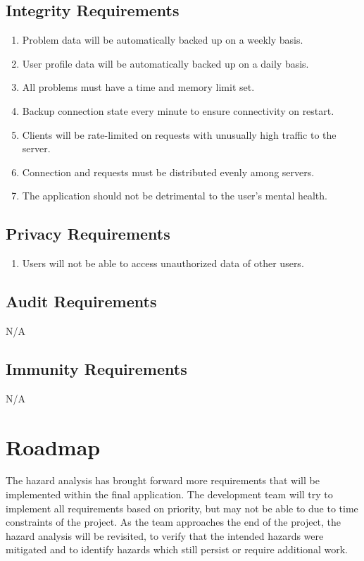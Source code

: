 \documentclass{article}
\begin{document}
\subsection{Integrity Requirements}
\begin{enumerate}[label=IR.\arabic*]
    \item Problem data will be automatically backed up on a weekly basis. \label{IR1}
    \item User profile data will be automatically backed up on a daily basis. \label{IR2}
    \item All problems must have a time and memory limit set. \label{IR3}
    \item Backup connection state every minute to ensure connectivity on restart. \label{IR4}
    \item Clients will be rate-limited on requests with unusually high traffic to the server. \label{IR5}
    \item Connection and requests must be distributed evenly among servers. \label{IR6}
    \item The application should not be detrimental to the user's mental health. \label{IR7}
\end{enumerate}

\subsection{Privacy Requirements}
\begin{enumerate}[label=PR.\arabic*]
    \item Users will not be able to access unauthorized data of other users. \label{PR1}
\end{enumerate}

\subsection{Audit Requirements}
N/A

\subsection{Immunity Requirements}
N/A

\section{Roadmap}

The hazard analysis has brought forward more requirements that will be implemented within the final application. The development team will try to implement all requirements based on priority, but may not be able to due to time constraints of the project. As the team approaches the end of the project, the hazard analysis will be revisited, to verify that the intended hazards were mitigated and to identify hazards which still persist or require additional work.
\end{document}

